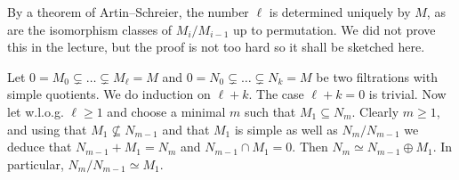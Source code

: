 \documentclass[a4paper,parskip=half,numbers=enddot, DIV=12, headheight=30pt]{scrreprt}
\begin{document}
\begin{rem}
    \begin{alphanumerate}
    \item {}
        By a theorem of Artin--Schreier, the number $\ell$ is determined uniquely by $M$, as are the isomorphism classes of $M_i/M_{i-1}$ up to permutation. We did not prove this in the lecture, but the proof is not too hard so it shall be sketched here.
        
        Let $0=M_0\subsetneq \ldots\subsetneq M_\ell=M$ and $0=N_0\subsetneq\ldots\subsetneq N_k=M$ be two filtrations with simple quotients. We do induction on $\ell+k$. The case $\ell+k=0$ is trivial. Now let w.l.o.g. $\ell\geq1$ and choose  a minimal $m$ such that $M_1\subseteq N_m$. Clearly $m\geq 1$, and using that $M_1\not\subseteq N_{m-1}$ and that $M_1$ is simple as well as $N_m/N_{m-1}$ we deduce that $N_{m-1}+M_1=N_m$ and $N_{m-1}\cap M_1=0$. Then $N_m\simeq N_{m-1}\oplus M_1$. In particular, $N_m/N_{m-1}\simeq M_1$.
        

\end{alphanumerate}
\end{rem}
\end{document}
